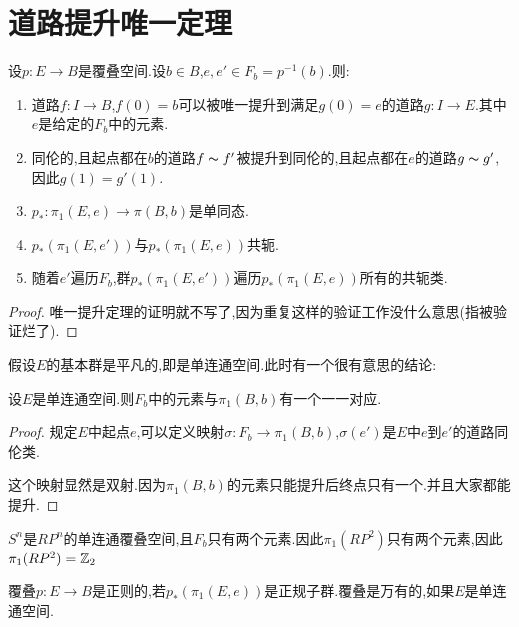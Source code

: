 \section{道路提升唯一定理}
\begin{theorem}
    设$p:E \to B$是覆叠空间.设$b \in B$,$e,e' \in F_b=p^{-1}(b)$.则:
    \begin{enumerate}
        \item 道路$f:I \to B$,$f(0)=b$可以被唯一提升到满足$g(0)=e$的道路$g:I \to E$.其中$e$是给定的$F_b$中的元素.
        \item 同伦的,且起点都在$b$的道路$f \thicksim f'$被提升到同伦的,且起点都在$e$的道路$g \thicksim g'$,因此$g(1)=g'(1)$.
        \item $p_*:\pi_1(E,e) \to \pi(B,b)$是单同态.
        \item $p_*(\pi_1(E,e'))$与$p_*(\pi_1(E,e))$共轭.
        \item 随着$e'$遍历$F_b$,群$p_*(\pi_1(E,e'))$遍历$p_*(\pi_1(E,e))$所有的共轭类.
    \end{enumerate}
  \end{theorem}
  \begin{proof}
    唯一提升定理的证明就不写了,因为重复这样的验证工作没什么意思(指被验证烂了).
  \end{proof}
  假设$E$的基本群是平凡的,即是单连通空间.此时有一个很有意思的结论:
      
      \begin{proposition}
        设$E$是单连通空间.则$F_b$中的元素与$\pi_1(B,b)$有一个一一对应.
      \end{proposition}
      \begin{proof}
        规定$E$中起点$e$,可以定义映射$\sigma:F_b \to \pi_1(B,b)$,$\sigma(e')$是$E$中$e$到$e'$的道路同伦类.

        这个映射显然是双射.因为$\pi_1(B,b)$的元素只能提升后终点只有一个.并且大家都能提升.
      \end{proof}
      \begin{example}
        $S^n$是$RP^n$的单连通覆叠空间,且$F_b$只有两个元素.因此$\pi_1(RP^2)$只有两个元素,因此$\pi_1(RP^2)=\mathbb{Z}_2$
      \end{example}
      \begin{definition}
        覆叠$p:E \to B$是正则的,若$p_*(\pi_1(E,e))$是正规子群.覆叠是万有的,如果$E$是单连通空间.
      \end{definition}
